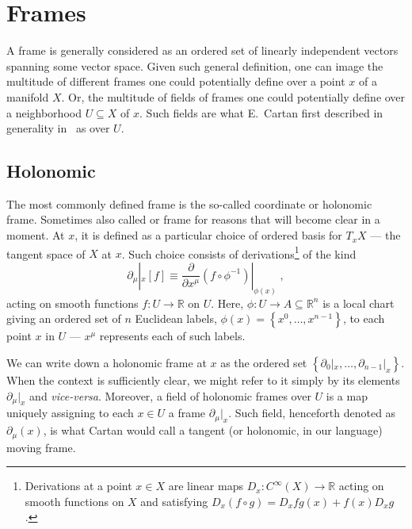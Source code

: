 \documentclass[../../main.tex]{subfiles}
\begin{document}
\section{Frames}\label{sec:holonomic_and_non-holonomic_frames}

A frame is generally considered as an ordered set of linearly independent vectors spanning some vector space. Given such general definition, one can image the multitude of different frames one could potentially define over a point $x$ of a manifold $X$. Or, the multitude of fields of frames one could potentially define over a neighborhood $U\subseteq X$ of $x$. Such fields are what E.~Cartan first described in generality in~\cite{weyl1938} as  over $U$.

\subsection{Holonomic}\label{ssec:holonomic}

The most commonly defined frame is the so-called coordinate or holonomic frame. Sometimes also called  or  frame for reasons that will become clear in a moment. At $x$, it is defined as a particular choice of ordered basis for $T_x X$ --- the tangent space of $X$ at $x$. Such choice consists of derivations\footnote{Derivations at a point $x\in X$ are linear maps $D_x:C^{\infty}\left(X\right)\rightarrow \mathbb{R}$ acting on smooth functions on $X$ and satisfying $D_x \left(f\circ g\right)=D_x f g(x) + f(x)D_x g$.} of the kind
\begin{equation}
  \label{eq:holonomic-basis}
  \partial_\mu|_x \left[f\right] \equiv \frac{\partial}{\partial x^\mu} \left(f\circ\phi^{-1}\right)|_{\phi(x)}\;,
\end{equation}
acting on smooth functions $f: U \rightarrow \mathbb{R}$ on $U$. Here, $ \phi: U \rightarrow A \subseteq \mathbb{R}^n $ is a local chart giving an ordered set of $n$ Euclidean labels, $\phi(x)=\left\{x^0,\ldots,x^{n-1}\right\}$, to each point $x$ in $U$ --- $x^\mu$ represents each of such labels.

We can  write down a holonomic frame at $x$ as the ordered set $\left\{\partial_0|_x, \ldots, \partial_{n-1}|_x\right\}$. When the context is sufficiently clear, we might refer to it simply by its elements $\partial_\mu|_x$ and \textit{vice-versa}. Moreover, a field of holonomic frames over $ U $ is a map uniquely assigning to each $ x \in U $ a frame $ \partial_\mu|_x $. Such field, henceforth denoted as $\partial_\mu \left(x\right)$, is what Cartan would call a tangent (or holonomic, in our language) moving frame.
\end{document}
